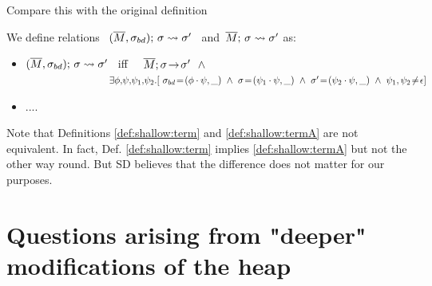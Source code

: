 Compare this with the original definition

\begin{definition}
\label{def:shallow:termA}
We define relations \    $(\overline{M}, \sigma_{bd});\, {\sigma} \rightsquigarrow \sigma'$ \ and\  $\overline{M};\, {\sigma} \rightsquigarrow \sigma'$ as:

\begin{itemize}
\item
 $(\overline{M}, \sigma_{bd});\, {\sigma} \rightsquigarrow \sigma'$ \    iff \ \   $\leadstoOrig {\Mtwo} {\sigma} {\sigma'} %
\ \  \wedge $\\
$\strut  \hspace{2.9cm}\ \      \exists \phi,\!\psi,\!\psi_1,\!\psi_2.[ \  \sigma\bd\! =\! (\phi\cdot\psi,\_) \ \wedge \ \sigma\! =\! (\psi_1\cdot \psi, \_)
\ \wedge\ \sigma'\! =\! (\psi_2\cdot \psi, \_)\ \wedge\ {\psi_1,\psi_2\!\neq\! \epsilon}] $ 
\item
....
 \end{itemize}
\end{definition}

Note that Definitions \ref{def:shallow:term} and \ref{def:shallow:termA} are not equivalent.
In fact, Def. \ref{def:shallow:term} implies \ref{def:shallow:termA} but not the other way round.
But SD believes that the difference does not matter for our purposes. 
%



\section{Questions arising from "deeper" modifications of the heap}

